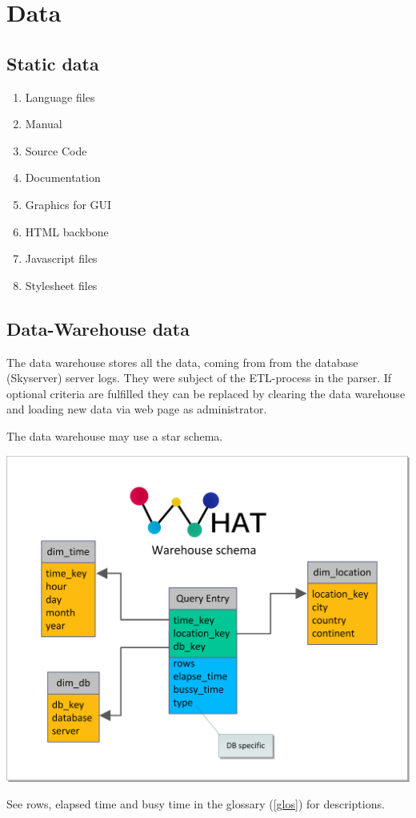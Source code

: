 \section{Data}
\renewcommand{\theenumi}{/D\arabic{enumi}0/}
\renewcommand{\labelenumi}{\theenumi}

\subsection{Static data}

\begin{enumerate}
  \item Language files
  \item Manual
  \item Source Code
  \item Documentation
  \item Graphics for GUI
  \item HTML backbone
  \item Javascript files
  \item Stylesheet files
\end{enumerate}



\newpage
\subsection{Data-Warehouse data} \label{WHschema}


The data warehouse stores all the data, coming from from the database (Skyserver) server logs.
They were subject of the ETL-process in the parser. If optional criteria are fulfilled
 they can be replaced by clearing the data warehouse 
 and loading new data via web page as administrator.

The data warehouse may use a star schema.
\begin{center}
\includegraphics[width=1\linewidth]{Pictures/WareHouseSchema.png}
\end{center}   
See rows, elapsed time and busy time in the glossary (\ref{glos}) for descriptions. 


